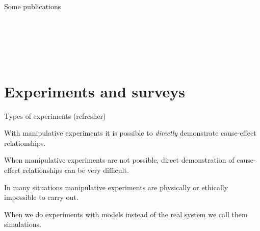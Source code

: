 \documentclass[10pt]{beamer}
\begin{document}
\begin{frame}{Some publications}
   \cite{Zhu2010}\\
   \cite{Denison2012}\\
   \cite{Evans2013}\\
   \cite{Sadras2021}\\
   \cite{Passioura2020}\\
   \cite{Sinclair2019}\\
\end{frame}

\section{Experiments and surveys}

\begin{frame}{Types of experiments (refresher)}
\begin{small}
    \begin{description}[type=1]
        \item[Manipulative experiments.] With manipulative experiments it
        is possible to \emph{directly} demonstrate cause-effect relationships.

        \item[Observational experiments.] When manipulative experiments
        are not possible, direct demonstration of cause-effect
        relationships can be very difficult.

        \item[Impossible experiments.] In many situations
        manipulative experiments are physically or ethically
        impossible to carry out.

        \item[Simulations.] When we do experiments with models
        instead of the real system we call them simulations.

        \item[\DExamples]

    \end{description}
\end{small}
\end{frame}
\end{document}
